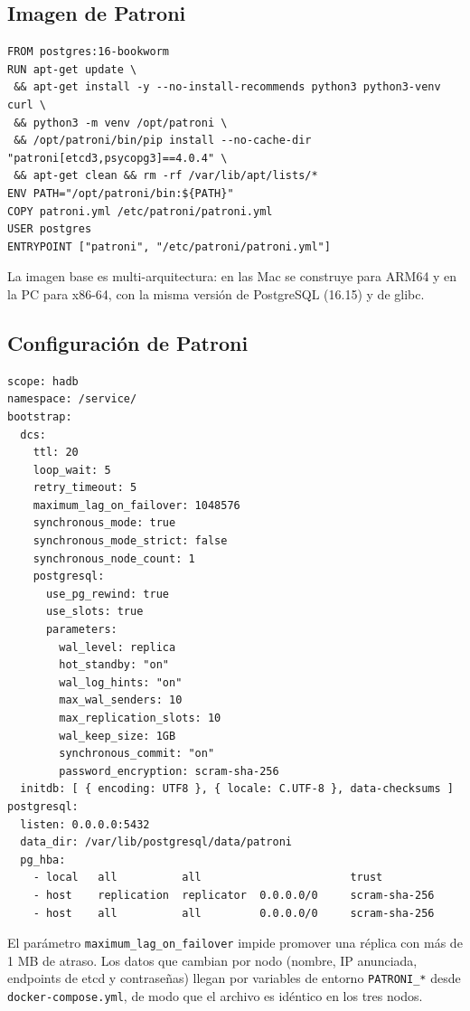 \documentclass[11pt,a4paper]{article}
\newcommand{\cod}[1]{\texttt{#1}}
\begin{document}
\subsection{Imagen de Patroni}

\begin{lstlisting}
FROM postgres:16-bookworm
RUN apt-get update \
 && apt-get install -y --no-install-recommends python3 python3-venv curl \
 && python3 -m venv /opt/patroni \
 && /opt/patroni/bin/pip install --no-cache-dir "patroni[etcd3,psycopg3]==4.0.4" \
 && apt-get clean && rm -rf /var/lib/apt/lists/*
ENV PATH="/opt/patroni/bin:${PATH}"
COPY patroni.yml /etc/patroni/patroni.yml
USER postgres
ENTRYPOINT ["patroni", "/etc/patroni/patroni.yml"]
\end{lstlisting}

La imagen base es multi-arquitectura: en las Mac se construye para ARM64 y en la PC para x86-64, con la misma versión de PostgreSQL (16.15) y de glibc.

\subsection{Configuración de Patroni}

\begin{lstlisting}
scope: hadb
namespace: /service/
bootstrap:
  dcs:
    ttl: 20
    loop_wait: 5
    retry_timeout: 5
    maximum_lag_on_failover: 1048576
    synchronous_mode: true
    synchronous_mode_strict: false
    synchronous_node_count: 1
    postgresql:
      use_pg_rewind: true
      use_slots: true
      parameters:
        wal_level: replica
        hot_standby: "on"
        wal_log_hints: "on"
        max_wal_senders: 10
        max_replication_slots: 10
        wal_keep_size: 1GB
        synchronous_commit: "on"
        password_encryption: scram-sha-256
  initdb: [ { encoding: UTF8 }, { locale: C.UTF-8 }, data-checksums ]
postgresql:
  listen: 0.0.0.0:5432
  data_dir: /var/lib/postgresql/data/patroni
  pg_hba:
    - local   all          all                       trust
    - host    replication  replicator  0.0.0.0/0     scram-sha-256
    - host    all          all         0.0.0.0/0     scram-sha-256
\end{lstlisting}

El parámetro \cod{maximum\_lag\_on\_failover} impide promover una réplica con más de 1 MB de atraso. Los datos que cambian por nodo (nombre, IP anunciada, endpoints de etcd y contraseñas) llegan por variables de entorno \cod{PATRONI\_*} desde \cod{docker-compose.yml}, de modo que el archivo es idéntico en los tres nodos.
\end{document}
